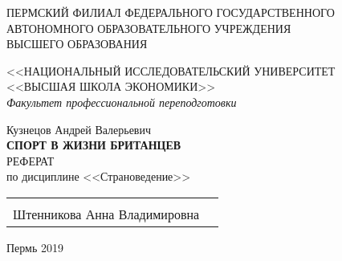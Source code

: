 \thispagestyle{empty}
\begin{center}
	ПЕРМСКИЙ ФИЛИАЛ ФЕДЕРАЛЬНОГО  ГОСУДАРСТВЕННОГО\\
	АВТОНОМНОГО ОБРАЗОВАТЕЛЬНОГО УЧРЕЖДЕНИЯ\\
	ВЫСШЕГО ОБРАЗОВАНИЯ
	\vspace{0.5ex}
	
	<<НАЦИОНАЛЬНЫЙ ИССЛЕДОВАТЕЛЬСКИЙ УНИВЕРСИТЕТ\\
	<<ВЫСШАЯ ШКОЛА ЭКОНОМИКИ>>\\
	\vspace{2ex}
\textit{Факультет профессиональной переподготовки}
\end{center}
\begin{center}
	\vspace{3ex}
	Кузнецов Андрей Валерьевич\\
	\vspace{6ex}
	\textbf{СПОРТ В ЖИЗНИ БРИТАНЦЕВ}\\
	\vspace{3ex}
	РЕФЕРАТ\\
	по дисциплине <<Страноведение>> \\
	\vspace{1ex}
	
\end{center}
	\vspace{8ex}
	\begin{tabularx}{\textwidth}{XX}
	& \begin{flushright}
		Руководитель\\
		Штенникова Анна Владимировна
	\end{flushright}\\
	\end{tabularx}
\begin{center}
	\vfill
	Пермь 2019
\end{center}
